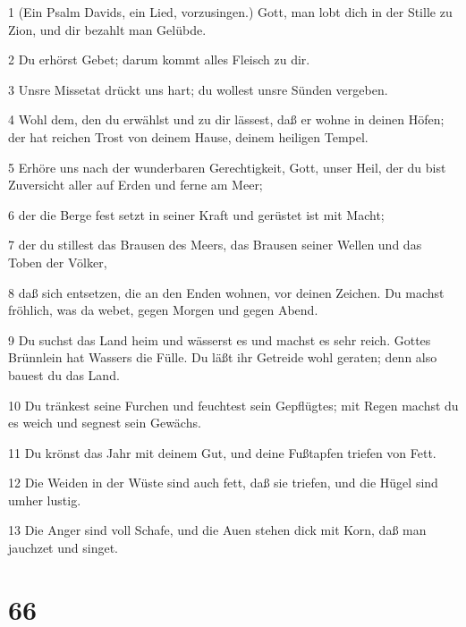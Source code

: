 \par 1 (Ein Psalm Davids, ein Lied, vorzusingen.) Gott, man lobt dich in der Stille zu Zion, und dir bezahlt man Gelübde.
\par 2 Du erhörst Gebet; darum kommt alles Fleisch zu dir.
\par 3 Unsre Missetat drückt uns hart; du wollest unsre Sünden vergeben.
\par 4 Wohl dem, den du erwählst und zu dir lässest, daß er wohne in deinen Höfen; der hat reichen Trost von deinem Hause, deinem heiligen Tempel.
\par 5 Erhöre uns nach der wunderbaren Gerechtigkeit, Gott, unser Heil, der du bist Zuversicht aller auf Erden und ferne am Meer;
\par 6 der die Berge fest setzt in seiner Kraft und gerüstet ist mit Macht;
\par 7 der du stillest das Brausen des Meers, das Brausen seiner Wellen und das Toben der Völker,
\par 8 daß sich entsetzen, die an den Enden wohnen, vor deinen Zeichen. Du machst fröhlich, was da webet, gegen Morgen und gegen Abend.
\par 9 Du suchst das Land heim und wässerst es und machst es sehr reich. Gottes Brünnlein hat Wassers die Fülle. Du läßt ihr Getreide wohl geraten; denn also bauest du das Land.
\par 10 Du tränkest seine Furchen und feuchtest sein Gepflügtes; mit Regen machst du es weich und segnest sein Gewächs.
\par 11 Du krönst das Jahr mit deinem Gut, und deine Fußtapfen triefen von Fett.
\par 12 Die Weiden in der Wüste sind auch fett, daß sie triefen, und die Hügel sind umher lustig.
\par 13 Die Anger sind voll Schafe, und die Auen stehen dick mit Korn, daß man jauchzet und singet.

\chapter{66}

